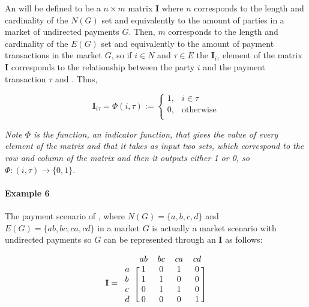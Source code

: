 \documentclass[12pt]{article}
\begin{document}
\begin{multicols}{2}
An  will be defined to be a $n \times m$ matrix $\textbf{I}$ where $n$ corresponds to the length and cardinality of the $N(G)$ set and equivalently to the amount of parties in a market of undirected payments $G$. Then, $m$ corresponds to the length and cardinality of the $E(G)$ set and equivalently to the amount of payment transactions in the market $G$, so if $i \in N$ and $\tau \in E$ the $\textbf{I}_{i\tau}$ element of the matrix $\textbf{I}$ corresponds to the relationship between the party $i$ and the payment transaction $\tau$ and . Thus,

\begin{equation} \label{eq:7}
 \textbf{I}_{i\tau} = \Phi(i, \tau) := \begin{cases}
			1, & i \in \tau\\
            0, & \text{otherwise}\\
		 \end{cases}
\end{equation}

\emph{Note $\Phi$ is the function, an indicator function, that gives the value of every element of the matrix and that it takes as input two sets, which correspond to the row and column of the matrix and then it outputs either 1 or 0, so $\Phi: (i, \tau) \rightarrow \{0, 1\}$}. 

\begin{mdframed}
\paragraph{Example 6} \label{ex6}
The payment scenario of , where  $N(G) = \{a, b, c, d\}$ and $E(G) = \{ab, bc, ca, cd\}$ in a market $G$ is actually a market scenario with undirected payments so $G$ can be represented through an  $\textbf{I}$ as follows:


\begin{equation} \label{eq8}
    \textbf{I} = \begin{blockarray}{lcccc}
     & ab & bc & ca & cd  \\
\begin{block}{l[cccc]}
  a & 1 & 0 & 1 & 0  \\
  b & 1 & 1 & 0 & 0  \\
  c & 0 & 1 & 1 & 0  \\
  d & 0 & 0 & 0 & 1  \\
\end{block}
\end{blockarray}
\end{equation}


\end{mdframed}
\end{multicols}
\end{document}
